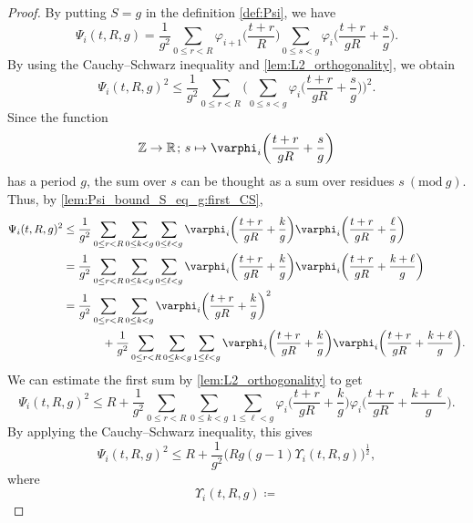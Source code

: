 \documentclass[hidelinks]{amsart}
\numberwithin{equation}{section}
\theoremstyle{plain}
\theoremstyle{definition}
\let\tmp\phi
\let\phi\varphi
\let\varphi\tmp
\let\tmp\epsilon
\let\epsilon\varepsilon
\let\varepsilon\tmp
\newcommand{\semicolon}{\nobreak\mskip2mu\mathpunct{}\nonscript
\mkern-\thinmuskip{;}\mskip6muplus1mu\relax}
\renewcommand{\mod}[1]{(\mathrm{mod}\ #1)}
\begin{document}
\begin{proof}
By putting $S=g$ in the definition \cref{def:Psi}, we have
\[
\Psi_{i}(t,R,g)
=
\frac{1}{g^{2}}
\sum_{0\le r<R}
\phi_{i+1}\biggl(\frac{t+r}{R}\biggr)
\sum_{0\le s<g}
\phi_{i}\biggl(\frac{t+r}{gR}+\frac{s}{g}\biggr).
\]
By using the Cauchy--Schwarz inequality
and \cref{lem:L2_orthogonality},
we obtain
\begin{equation}
\label{lem:Psi_bound_S_eq_g:first_CS}
\Psi_{i}(t,R,g)^{2}
\le
\frac{1}{g^{2}}
\sum_{0\le r<R}
\biggl(\sum_{0\le s<g}
\phi_{i}\biggl(\frac{t+r}{gR}+\frac{s}{g}\biggr)\biggr)^{2}.
\end{equation}
Since the function
\[
\mathbb{Z}
\to
\mathbb{R}
\semicolon
s
\mapsto
\phi_{i}\biggl(\frac{t+r}{gR}+\frac{s}{g}\biggr)
\]
has a period $g$, the sum over $s$ can be thought as a sum over residues $s\ \mod{g}$.
Thus, by \cref{lem:Psi_bound_S_eq_g:first_CS},
\begin{equation}
\label{lem:Psi_bound_S_eq_g:expand_square}
\begin{aligned}
\Psi_{i}(t,R,g)^{2}
&\le
\frac{1}{g^{2}}
\sum_{0\le r<R}
\sum_{0\le k<g}
\sum_{0\le\ell<g}
\phi_{i}\biggl(\frac{t+r}{gR}+\frac{k}{g}\biggr)
\phi_{i}\biggl(\frac{t+r}{gR}+\frac{\ell}{g}\biggr)\\
&=
\frac{1}{g^{2}}
\sum_{0\le r<R}
\sum_{0\le k<g}
\sum_{0\le\ell<g}
\phi_{i}\biggl(\frac{t+r}{gR}+\frac{k}{g}\biggr)
\phi_{i}\biggl(\frac{t+r}{gR}+\frac{k+\ell}{g}\biggr)\\
&=
\frac{1}{g^{2}}
\sum_{0\le r<R}
\sum_{0\le k<g}
\phi_{i}\biggl(\frac{t+r}{gR}+\frac{k}{g}\biggr)^{2}\\
&\hspace{0.1\textwidth}+
\frac{1}{g^{2}}
\sum_{0\le r<R}
\sum_{0\le k<g}
\sum_{1\le\ell<g}
\phi_{i}\biggl(\frac{t+r}{gR}+\frac{k}{g}\biggr)
\phi_{i}\biggl(\frac{t+r}{gR}+\frac{k+\ell}{g}\biggr).
\end{aligned}
\end{equation}
We can estimate the first sum by \cref{lem:L2_orthogonality} to get
\[
\Psi_{i}(t,R,g)^{2}
\le
R+
\frac{1}{g^{2}}
\sum_{0\le r<R}
\sum_{0\le k<g}
\sum_{1\le\ell<g}
\phi_{i}\biggl(\frac{t+r}{gR}+\frac{k}{g}\biggr)
\phi_{i}\biggl(\frac{t+r}{gR}+\frac{k+\ell}{g}\biggr).
\]
By applying the Cauchy--Schwarz inequality, this gives
\begin{equation}
\label{lem:Psi_bound_S_eq_g:second_CS}
\Psi_{i}(t,R,g)^{2}
\le
R+
\frac{1}{g^{2}}
\bigl(Rg(g-1)\Upsilon_{i}(t,R,g)\bigr)^{\frac{1}{2}},
\end{equation}
where
\[
\Upsilon_{i}(t,R,g)
\coloneqq
\]
\end{proof}
\end{document}
